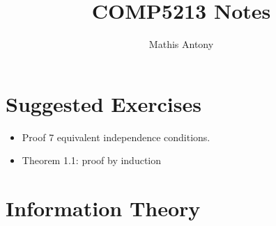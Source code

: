 \documentclass[a4paper]{scrartcl}
\title{COMP5213 Notes}
\author{Mathis Antony}
\begin{document}
\maketitle
\section{Suggested Exercises}
\begin{itemize}
  \item Proof 7 equivalent independence conditions.
  \item Theorem 1.1: proof by induction
\end{itemize}
\section{Information Theory}
\end{document}
